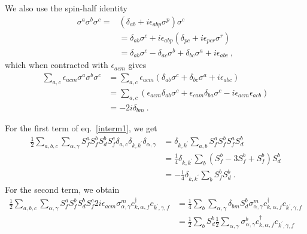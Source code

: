 We also use the spin-half identity
\begin{equation}\begin{aligned}\label{identity1}
	\sigma^a \sigma^b \sigma^c =& (\delta_{ab} + i\epsilon_{abp}\sigma^p)\sigma^c\\
									  &=\delta_{ab}\sigma^c + i\epsilon_{abp}(\delta_{pc} + i\epsilon_{pcr}\sigma^r)\\
									  &=\delta_{ab}\sigma^c - \delta_{ac}\sigma^b + \delta_{bc} \sigma^a + i\epsilon_{abc}~,
\end{aligned}\end{equation}
which when contracted with \(\epsilon_{acm}\) gives
\begin{equation}\begin{aligned}
	\sum_{a,c}\epsilon_{acm}\sigma^a \sigma^b \sigma^c &= \sum_{a,c}\epsilon_{acm}(\delta_{ab}\sigma^c + \delta_{bc} \sigma^a + i\epsilon_{abc}) \\
													   &= \sum_{a,c}(\epsilon_{acm}\delta_{ab}\sigma^c + \epsilon_{cam}\delta_{ba} \sigma^c - i\epsilon_{acm}\epsilon_{acb})\\
													   &= - 2i\delta_{bm}~.
\end{aligned}\end{equation}

For the first term of eq.~\ref{interm1}, we get
\begin{equation}\begin{aligned}
	\frac{1}{2}\sum_{a,b,c} \sum_{\alpha,\gamma} S_f^a S_f^b S_d^b S_f^c \delta_{a,c}\delta_{k,k^\prime}\delta_{\alpha,\gamma} &= \delta_{k,k^\prime}\sum_{a,b}S_f^a S_f^b S_f^a S_d^b\\
																															   &= \frac{1}{4} \delta_{k,k^\prime}\sum_{b}(S_f^b - 3 S_f^b + S_f^b) S_d^b\\
																															   &= -\frac{1}{4} \delta_{k,k^\prime}\sum_{b}S_f^b S_d^b~.
\end{aligned}\end{equation}
For the second term, we obtain
\begin{equation}\begin{aligned}
	\frac{1}{2}\sum_{a,b,c} \sum_{\alpha,\gamma} S_f^a S_f^b S_d^b S_f^c 2i \epsilon_{acm} \sigma^m_{\alpha,\gamma}c^\dagger_{k,\alpha,f} c_{k^\prime,\gamma,f} &= \frac{1}{4}\sum_{b} \sum_{\alpha,\gamma}\delta_{bm} S_d^b \sigma^m_{\alpha,\gamma}c^\dagger_{k,\alpha,f} c_{k^\prime,\gamma,f}\\
																																								&= \frac{1}{2}\sum_{b} S_d^b \frac{1}{2}\sum_{\alpha,\gamma}\sigma^b_{\alpha,\gamma}c^\dagger_{k,\alpha,f} c_{k^\prime,\gamma,f}
\end{aligned}\end{equation}

